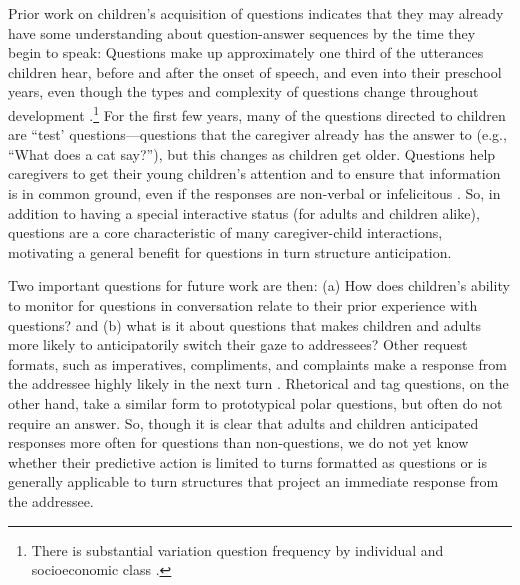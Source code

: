 \documentclass[authoryear, 12pt]{elsarticle}
\begin{document}


Prior work on children's acquisition of questions indicates that they may already have some understanding about question-answer sequences by the time they begin to speak: Questions make up approximately one third of the utterances children hear, before and after the onset of speech, and even into their preschool years, even though the types and complexity of questions change throughout development \citep{casillas2016, fitneva2012, henning2005, shatz1979}.\footnote{There is substantial variation question frequency by individual and socioeconomic class \citep{hart1992}.} For the first few years, many of the questions directed to children are ``test' questions---questions that the caregiver already has the answer to (e.g., ``What does a cat say?''), but this changes as children get older. Questions help caregivers to get their young children's attention and to ensure that information is in common ground, even if the responses are non-verbal or infelicitous \citep{bruner1985, fitneva2012, snow1977}. So, in addition to having a special interactive status (for adults and children alike), questions are a core characteristic of many caregiver-child interactions, motivating a general benefit for questions in turn structure anticipation.

Two important questions for future work are then: (a) How does children's ability to monitor for questions in conversation relate to their prior experience with questions? and (b) what is it about questions that makes children and adults more likely to anticipatorily switch their gaze to addressees? Other request formats, such as imperatives, compliments, and complaints make a response from the addressee highly likely in the next turn \citep{schegloff2007}. Rhetorical and tag questions, on the other hand, take a similar form to prototypical polar questions, but often do not require an answer. So, though it is clear that adults and children anticipated responses more often for questions than non-questions, we do not yet know whether their predictive action is limited to turns formatted as questions or is generally applicable to turn structures that project an immediate response from the addressee. 
\end{document}
